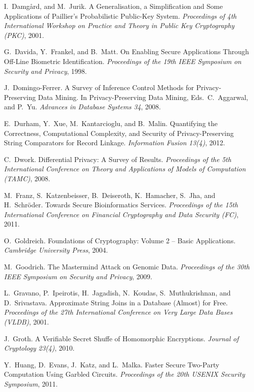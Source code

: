 \documentclass{llncs}
\begin{document}
\begin{thebibliography}{10}
I.~Damg{\aa}rd, and M.~Jurik.
A Generalisation, a Simplification and Some Applications of Paillier's Probabilistic Public-Key System.
{\em Proceedings of 4th International Workshop on Practice and Theory in Public Key Cryptography (PKC)},
2001.

G.~Davida, Y.~Frankel, and B.~Matt.
On Enabling Secure Applications Through Off-Line Biometric Identification.
{\em Proceedings of the 19th IEEE Symposium on Security and Privacy},
1998.

J.~Domingo-Ferrer.
A Survey of Inference Control Methods for Privacy-Preserving Data Mining.
In Privacy-Preserving Data Mining, Eds.~C.~Aggarwal, and P.~Yu.
{\em Advances in Database Systems 34}, 2008.

E.~Durham, Y.~Xue, M.~Kantarcioglu, and B.~Malin.
Quantifying the Correctness, Computational Complexity, and Security of Privacy-Preserving String Comparators for Record Linkage.
{\em Information Fusion 13(4)}, 2012.

C.~Dwork.
Differential Privacy: A Survey of Results.
{\em Proceedings of the 5th International Conference on Theory and Applications of Models of Computation (TAMC)}, 
2008.

M.~Franz, S.~Katzenbeisser, B.~Deiseroth, K.~Hamacher, S.~Jha, and H.~Schr\"oder.
Towards Secure Bioinformatics Services.
{\em Proceedings of the 15th International Conference on Financial Cryptography and Data Security (FC)},
2011.

O.~Goldreich.
Foundations of Cryptography: Volume 2 -- Basic Applications.
{\em Cambridge University Press},
2004.

M.~Goodrich.
The Mastermind Attack on Genomic Data.
{\em Proceedings of the 30th IEEE Symposium on Security and Privacy},
2009.

L.~Gravano, P.~Ipeirotis, H.~Jagadish, N.~Koudas, S.~Muthukrishnan, and D.~Srivastava.
Approximate String Joins in a Database (Almost) for Free.
{\em Proceedings of the 27th International Conference on Very Large Data Bases (VLDB)}, 2001.

J.~Groth.
A Verifiable Secret Shuffe of Homomorphic Encryptions.
{\em Journal of Cryptology 23(4)},
2010.

Y.~Huang, D.~Evans, J.~Katz, and L.~Malka.
Faster Secure Two-Party Computation Using Garbled Circuits.
{\em Proceedings of the 20th USENIX Security Symposium},
2011.


\end{thebibliography}
\end{document}
